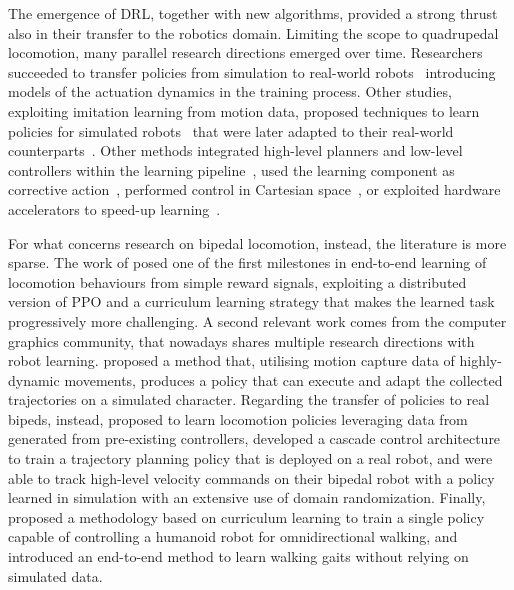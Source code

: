 \pagebreak[1]
The emergence of \ac{DRL}, together with new algorithms, provided a strong thrust also in their transfer to the robotics domain.
Limiting the scope to quadrupedal locomotion, many parallel research directions emerged over time.
Researchers succeeded to transfer policies from simulation to real-world robots~\parencite{tan_sim--real_2018, hwangboLearningAgileDynamic2019s} introducing
models of the actuation dynamics in the training process.
Other studies, exploiting imitation learning from motion data, proposed techniques to learn policies for simulated robots~\parencite{peng_learning_2020} that were later adapted to their real-world counterparts~\parencite{smith_legged_2021}.
Other methods integrated high-level planners and low-level controllers within the learning pipeline~\parencite{tsounis_deepgait_2020}, used the learning component as corrective action~\parencite{gangapurwala_real-time_2021}, performed control in Cartesian space~\parencite{bellegarda_robust_2021}, or exploited hardware accelerators to speed-up learning~\parencite{rudin_learning_2021}.

For what concerns research on bipedal locomotion, instead, the literature is more sparse.
The work of \textcite{heess_emergence_2017} posed one of the first milestones in end-to-end learning of locomotion behaviours from simple reward signals, exploiting a distributed version of \ac{PPO} and a curriculum learning strategy that makes the learned task progressively more challenging.
A second relevant work comes from the computer graphics community, that nowadays shares multiple research directions with robot learning.
\textcite{peng_deepmimic_2018} proposed a method that, utilising motion capture data of highly-dynamic movements, produces a policy that can execute and adapt the collected trajectories on a simulated character.
Regarding the transfer of policies to real bipeds, instead, \textcite{xieIterativeReinforcementLearning2019s} proposed to learn locomotion policies leveraging data from generated from pre-existing controllers, \textcite{castillo_robust_2021} developed a cascade control architecture to train a trajectory planning policy that is deployed on a real robot, and \textcite{li_reinforcement_2021} were able to track high-level velocity commands on their bipedal robot with a policy learned in simulation with an extensive use of domain randomization.
Finally, \textcite{rodriguez_deepwalk_2021} proposed a methodology based on curriculum learning to train a single policy capable of controlling a humanoid robot for omnidirectional walking, and \textcite{bloesch_towards_2022} introduced an end-to-end method to learn walking gaits without relying on simulated data.


